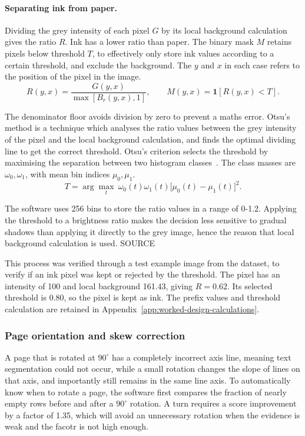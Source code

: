 \paragraph{Separating ink from paper.}
Dividing the grey intensity of each pixel $G$ by its local background calculation gives the ratio $R$. Ink has a lower ratio than paper. The binary mask $M$ retains pixels below threshold $T$, to effectively only store ink values according to a certain threshold, and exclude the background. The $y$ and $x$ in each case refers to the position of the pixel in the image.
\begin{equation}
R(y,x)=\frac{G(y,x)}{\max[B_r(y,x),1]},\qquad
M(y,x)=\mathbf{1}[R(y,x)<T].
\label{eq:des-ratio}
\end{equation}

The denominator floor avoids division by zero to prevent a maths error. Otsu's method is a technique which analyses the ratio values between the grey intensity of the pixel and the local background calculation, and finds the optimal dividing line to get the correct threshold. Otsu's criterion selects the threshold by maximising the separation between two histogram classes~\cite{otsu1979}. The class masses are $\omega_0,\omega_1$, with mean bin indices $\mu_0,\mu_1$.
\begin{equation}
T=\arg\max_t\ \omega_0(t)\omega_1(t)
\bigl[\mu_0(t)-\mu_1(t)\bigr]^2.
\label{eq:des-otsu}
\end{equation}

The software uses 256 bins to store the ratio values in a range of 0-1.2. Applying the threshold to a brightness ratio makes the decision less sensitive to gradual shadows than applying it directly to the grey image, hence the reason that local background calculation is used. SOURCE

This process was verified through a test example image from the dataset, to verify if an ink pixel was kept or rejected by the threshold. The pixel has an intensity of 100 and local background 161.43, giving $R=0.62$. Its selected threshold is 0.80, so the pixel is kept as ink. The prefix values and threshold calculation are retained in Appendix~\ref{app:worked-design-calculations}.

\subsubsection{Page orientation and skew correction}
A page that is rotated at $90^\circ$ has a completely incorrect axis line, meaning text segmentation could not occur, while a small rotation changes the slope of lines on that axis, and importantly still remains in the same line axis. To automatically know when to rotate a page, the software first compares the fraction of nearly empty rows before and after a $90^\circ$ rotation. A turn requires a score improvement by a factor of 1.35, which will avoid an unnecessary rotation when the evidence is weak and the facotr is not high enough.

